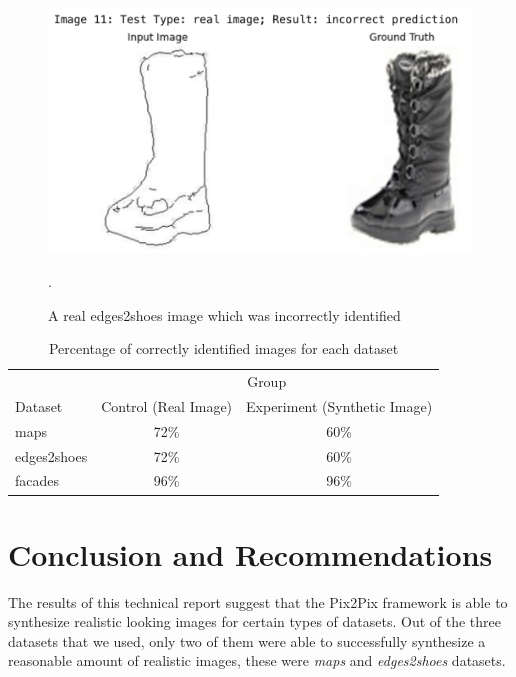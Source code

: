 \documentclass[peerreview]{IEEEtran}
\begin{document}
\begin{figure}[t]
\centering
\includegraphics[width=0.8\columnwidth]{Edges2Shoes real incorrect.png}
\caption{A real edges2shoes image which was incorrectly identified}.
\label{fig:edges2shoesrealincorrect}
\end{figure}


\begin{table}
\centering %
\begin{tabular}{l c c} %
\toprule %
& \multicolumn{2}{c}{Group} \\ %
\cmidrule(l){2-3} %
Dataset & Control (Real Image) & Experiment (Synthetic Image)\\ %
\midrule %
maps & 72\% & 60\% \\
edges2shoes & 72\% & 60\% \\
facades & 96\% & 96\% \\
\bottomrule %
\end{tabular}
\smallskip 
\caption{Percentage of correctly identified images for each dataset}
\label{tab:results} 
\end{table}

\section{Conclusion and Recommendations}
The results of this technical report suggest that the Pix2Pix framework is able to synthesize realistic looking images for certain types of datasets. Out of the three datasets that we used, only two of them were able to successfully synthesize a reasonable amount of realistic images, these were \textit{maps} and \textit{edges2shoes} datasets. 
\end{document}
